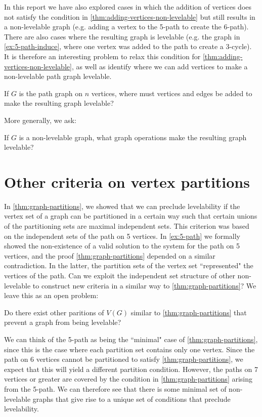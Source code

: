 In this report we have also explored cases in which the addition of vertices does not satisfy the condition in \autoref{thm:adding-vertices-non-levelable} but still results in a non-levelable graph (e.g. adding a vertex to the 5-path to create the 6-path). There are also cases where the resulting graph is levelable (e.g. the graph in \autoref{ex:5-path-induce}, where one vertex was added to the path to create a 3-cycle). It is therefore an interesting problem to relax this condition for \autoref{thm:adding-vertices-non-levelable}, as well as identify where we can add vertices to make a non-levelable path graph levelable.
\begin{question}
If $G$ is the path graph on $n$ vertices, where must vertices and edges be added to make the resulting graph levelable?
\end{question}
\noindent
More generally, we ask:
\begin{question}
If $G$ is a non-levelable graph, what graph operations make the resulting graph levelable?
\end{question}

\section{Other criteria on vertex partitions} \label{sec:other-criteria}
In \autoref{thm:graph-partitions}, we showed that we can preclude levelability if the vertex set of a graph can be partitioned in a certain way such that certain unions of the partitioning sets are maximal independent sets. This criterion was based on the independent sets of the path on 5 vertices. In \autoref{ex:5-path} we formally showed the non-existence of a valid solution to the system for the path on 5 vertices, and the proof \autoref{thm:graph-partitions} depended on a similar contradiction. In the latter, the partition sets of the vertex set ``represented" the vertices of the path. Can we exploit the independent set structure of other non-levelable to construct new criteria in a similar way to \autoref{thm:graph-partitions}? We leave this as an open problem: 
\begin{question} 
Do there exist other paritions of $V(G)$ similar to \autoref{thm:graph-partitions} that prevent a graph from being levelable?
\end{question}
\noindent
We can think of the 5-path as being the ``minimal" case of \autoref{thm:graph-partitions}, since this is the case where each partition set contains only one vertex. Since the path on 6 vertices cannot be partitioned to satisfy \autoref{thm:graph-partitions}, we expect that this will yield a different partition condition. However, the paths on 7 vertices or greater are covered by the condition in \autoref{thm:graph-partitions} arising from the 5-path. We can therefore see that there is some minimal set of non-levelable graphs that give rise to a unique set of conditions that preclude levelability. 

